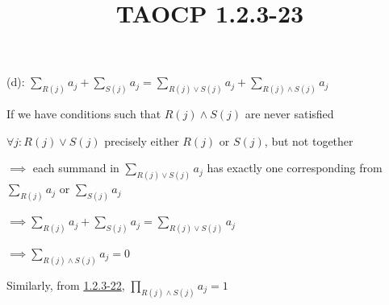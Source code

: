 \documentclass{article}
\title{TAOCP 1.2.3\mbox{-}23}
\begin{document}
\maketitle

(d): \( \sum_{R(j)} a_{j} + \sum_{S(j)} a_{j} = \sum_{R(j) \lor S(j)} a_{j} + \sum_{R(j) \land S(j)} a_{j} \)

If we have conditions such that \( R(j) \land S(j) \) are never satisfied

\( \forall j: R(j) \lor S(j) \) precisely either \( R(j) \) or \( S(j) \), but not together

\( \implies \) each summand in \( \sum_{R(j) \lor S(j)} a_{j} \) has exactly one corresponding from \( \sum_{R(j)} a_{j} \) or \( \sum_{S(j)} a_{j} \)

\( \implies \sum_{R(j)} a_{j} + \sum_{S(j)} a_{j} = \sum_{R(j) \lor S(j)} a_{j} \)

\( \implies \sum_{R(j) \land S(j)} a_{j} = 0 \)

Similarly, from \href{./1.2.3-22.pdf}{1.2.3\mbox{-}22}, \( \prod_{R(j) \land S(j)} a_{j} = 1 \)
\end{document}
